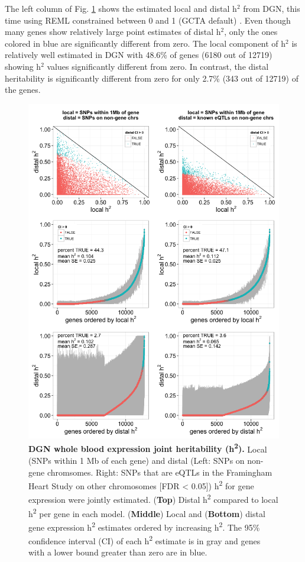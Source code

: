 \documentclass[10pt,letterpaper]{article}
\begin{document}
The left column of Fig. \ref{fig-dgn-jt-h2} shows the estimated local and distal h$^2$ from DGN, this time using REML constrained between 0 and 1 (GCTA default) \cite{Yang_2011}. Even though many genes show relatively large point estimates of distal h$^2$, only the ones colored in blue are significantly different from zero. The local component of h$^2$ is relatively well estimated in DGN with 
48.6\% of genes  (6180 out of 12719) showing h$^2$ values significantly different from zero. In contrast, the distal heritability is significantly different from zero for only 2.7\% (343 out of 12719) of the genes. 

\begin{figure}[h]
\includegraphics[width=12cm]{Figures/Fig-DGN-jt-h2.png}
\caption{{\bf DGN whole blood expression joint heritability
(h\textsuperscript{2}).} Local (SNPs within 1 Mb of each gene) and distal
(Left: SNPs on non-gene chromsomes. Right: SNPs that are eQTLs in the
Framingham Heart Study on other chromosomes {[}FDR \textless{} 0.05{]})
h\textsuperscript{2} for gene expression were jointly estimated.
(\textbf{Top}) Distal h\textsuperscript{2} compared to local
h\textsuperscript{2} per gene in each model. (\textbf{Middle}) Local and
(\textbf{Bottom}) distal gene expression h\textsuperscript{2} estimates
ordered by increasing h\textsuperscript{2}. The 95\% confidence interval
(CI) of each h\textsuperscript{2} estimate is in gray and genes with a
lower bound greater than zero are in blue.}
\label{fig-dgn-jt-h2}
\end{figure}
\end{document}
